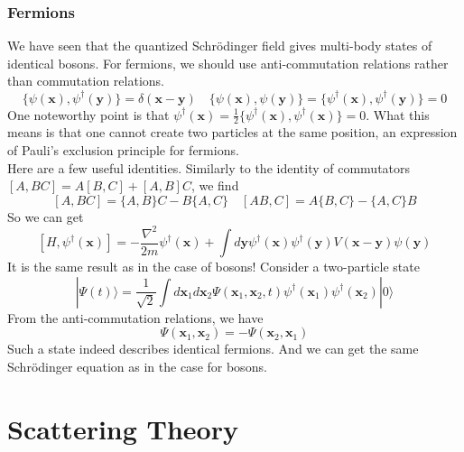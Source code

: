 \subsection{Fermions}
We have seen that the quantized Schr\"{o}dinger field gives multi-body states of identical bosons. For fermions, we should use anti-commutation relations rather than commutation relations.
\[\{\psi(\bm{x}),\psi^{\dagger}(\bm{y})\} = \delta(\bm{x}-\bm{y}) \quad \{\psi(\bm{x}),\psi(\bm{y})\} = \{\psi^{\dagger}(\bm{x}),\psi^{\dagger}(\bm{y})\} = 0\]
One noteworthy point is that $\psi^{\dagger}(\bm{x}) = \frac{1}{2}\{\psi^{\dagger}(\bm{x}),\psi^{\dagger}(\bm{x})\} = 0$. 
What this means is that one cannot create two particles at the same position, an expression of Pauli's exclusion principle for fermions.\\
Here are a few useful identities. Similarly to the identity of commutators $[A,BC] = A[B,C] + [A,B]C$, we find
\[[A,BC] = \{A,B\}C - B\{A,C\} \quad [AB,C] = A\{B,C\} - \{A,C\}B\]
So we can get
\[[H,\psi^{\dagger}(\bm{x})] = -\frac{\nabla^2}{2m}\psi^{\dagger}(\bm{x}) + \int d\bm{y} \psi^{\dagger}(\bm{x}) \psi^{\dagger}(\bm{y})V(\bm{x}-\bm{y})\psi(\bm{y})\]
It is the same result as in the case of bosons!
Consider a two-particle state
\[|\Psi(t)\rangle = \frac{1}{\sqrt{2}} \int d\bm{x}_1 d\bm{x}_2 \Psi(\bm{x}_1,\bm{x}_2,t) \psi^{\dagger}(\bm{x}_1)\psi^{\dagger}(\bm{x}_2) |0\rangle\]
From the anti-commutation relations, we have
\[\Psi(\bm{x}_1,\bm{x}_2) = - \Psi(\bm{x}_2,\bm{x}_1)\]
Such a state indeed describes identical fermions. And we can get the same Schr\"{o}dinger equation as in the case for bosons.

\chapter{Scattering Theory}
